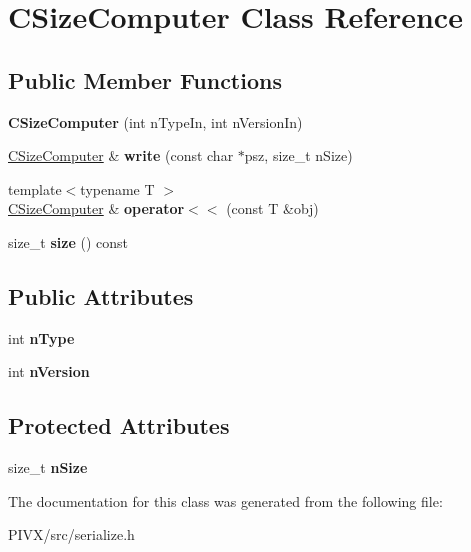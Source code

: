 \hypertarget{class_c_size_computer}{}\section{C\+Size\+Computer Class Reference}
\label{class_c_size_computer}
\subsection*{Public Member Functions}
\begin{DoxyCompactItemize}
\item 
\mbox{\label{class_c_size_computer_a475a1a15be285c38c4b94ad0ab0ce73c}} 
{\bfseries C\+Size\+Computer} (int n\+Type\+In, int n\+Version\+In)
\item 
\mbox{\label{class_c_size_computer_ad4b4f5e37acacf894f60c728e694ee89}} 
\mbox{\hyperlink{class_c_size_computer}{C\+Size\+Computer}} \& {\bfseries write} (const char $\ast$psz, size\+\_\+t n\+Size)
\item 
\mbox{\label{class_c_size_computer_a03a29c76f82dca1559e7922b35bebd0d}} 
{\footnotesize template$<$typename T $>$ }\\\mbox{\hyperlink{class_c_size_computer}{C\+Size\+Computer}} \& {\bfseries operator$<$$<$} (const T \&obj)
\item 
\mbox{\label{class_c_size_computer_a649d670bdcfee2b47a1982af566d3d7d}} 
size\+\_\+t {\bfseries size} () const
\end{DoxyCompactItemize}
\subsection*{Public Attributes}
\begin{DoxyCompactItemize}
\item 
\mbox{\label{class_c_size_computer_a1f166e95dc06a6f3718b2fac9cda18ee}} 
int {\bfseries n\+Type}
\item 
\mbox{\label{class_c_size_computer_a25759db1089e475fcba2f408633dc7bf}} 
int {\bfseries n\+Version}
\end{DoxyCompactItemize}
\subsection*{Protected Attributes}
\begin{DoxyCompactItemize}
\item 
\mbox{\label{class_c_size_computer_a3ea758bb100dd9ce38071e040cd3c597}} 
size\+\_\+t {\bfseries n\+Size}
\end{DoxyCompactItemize}


The documentation for this class was generated from the following file\+:\begin{DoxyCompactItemize}
\item 
P\+I\+V\+X/src/serialize.\+h\end{DoxyCompactItemize}
